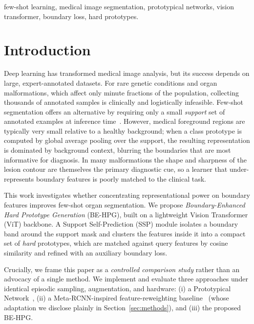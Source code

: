 \documentclass[conference]{IEEEtran}
\begin{document}
\begin{IEEEkeywords}
few-shot learning, medical image segmentation, prototypical networks, vision transformer,
boundary loss, hard prototypes.
\end{IEEEkeywords}

\section{Introduction}
Deep learning has transformed medical image analysis, but its success depends on large,
expert-annotated datasets. For rare genetic conditions and organ malformations, which affect
only minute fractions of the population, collecting thousands of annotated samples is clinically
and logistically infeasible. Few-shot segmentation offers an alternative by requiring only a
small \emph{support} set of annotated examples at inference time~\cite{snell2017prototypical,
hansen2022anomaly,roy2020squeeze}. However, medical foreground regions are typically very small
relative to a healthy background; when a class prototype is computed by global average pooling
over the support, the resulting representation is dominated by background context, blurring the
boundaries that are most informative for diagnosis. In many malformations the shape and sharpness
of the lesion contour are themselves the primary diagnostic cue, so a learner that
under-represents boundary features is poorly matched to the clinical task.

This work investigates whether concentrating representational power on boundary features
improves few-shot organ segmentation. We propose \emph{Boundary-Enhanced Hard Prototype
Generation} (BE-HPG), built on a lightweight Vision Transformer (ViT) backbone. A Support
Self-Prediction (SSP) module isolates a boundary band around the support mask and clusters the
features inside it into a compact set of \emph{hard} prototypes, which are matched against query
features by cosine similarity and refined with an auxiliary boundary loss.

Crucially, we frame this paper as a \emph{controlled comparison study} rather than an
advocacy of a single method. We implement and evaluate three approaches under identical
episodic sampling, augmentation, and hardware: (i) a Prototypical Network~\cite{snell2017prototypical},
(ii) a Meta-RCNN-inspired feature-reweighting baseline~\cite{yan2019meta} (whose adaptation we
disclose plainly in Section~\ref{sec:methods}), and (iii) the proposed BE-HPG.
\end{document}
